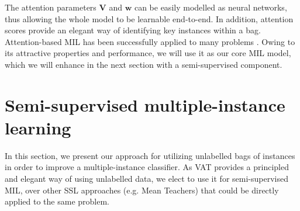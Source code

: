 \documentclass[journal,twoside,web]{ieeecolor}
\begin{document}
The attention parameters $\mathbf{V}$ and $\mathbf{w}$  can be easily modelled
as neural networks, thus  allowing the whole model to be learnable end-to-end. 
In addition, attention scores provide an elegant way of identifying key
instances within a bag.  Attention-based MIL has been successfully applied to
many problems \cite{alpapado2020pd,9098062,alpapado2021dr}.  Owing to its
attractive properties and performance, we will use it as our core MIL model,
which we will enhance in the next section with a semi-supervised
component. %

\section{Semi-supervised multiple-instance learning}
\label{sec:approach}
In this section, we present our approach for utilizing unlabelled bags of
instances in order to improve a multiple-instance classifier.  As VAT provides a
principled and elegant way of using unlabelled data, we elect to use it for
semi-supervised MIL, over other SSL approaches (e.g. Mean Teachers) 
that could be directly applied to
the same problem. 
\end{document}
